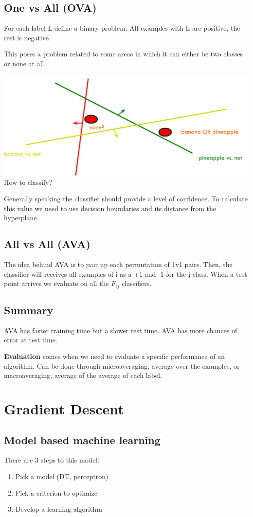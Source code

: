 \documentclass[oneside]{book}
\theoremstyle{definition}
\begin{document}
\section{One vs All (OVA)}

For each label L define a binary problem. All examples with L are positive, the rest is negative.

This poses a problem related to some areas in which it can either be two classes or none at all.

\includegraphics[scale=0.1]{multiclass}
 How to classify? 

Generally speaking the classifier should provide a level of confidence. To calculate this value we need to use decision boundaries and its distance from the hyperplane.
 
\section{All vs All (AVA)}
The idea behind AVA is to pair up each permutation of 1v1 pairs. Then, the classifier will receives all examples of i as a +1 and -1 for the j class. When a test point arrives we evaluate on all the $F_{ij}$ classifiers. 

\section{Summary}
AVA has faster training time but a slower test time. AVA has more chances of error at test time.

\textbf{Evaluation} comes when we need to evaluate a specific performance of an algorithm. Can be done through microaveraging, average over the examples, or macroaveraging, average of the average of each label.

\chapter{Gradient Descent}
\section{Model based machine learning}
There are 3 steps to this model:
\begin{enumerate}
	\item Pick a model (DT, perceptron)
	\item Pick a criterion to optimize
	\item Develop a learning algorithm
\end{enumerate}
\end{document}
